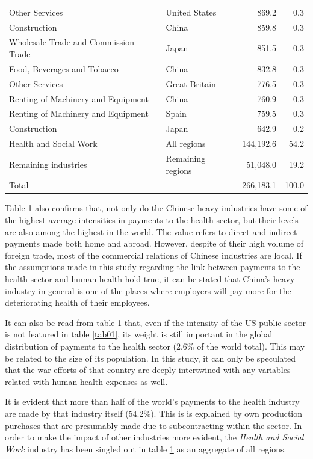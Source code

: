 \documentclass[a4paper,12pt, ]{article}
\begin{document}
\begin{table}
\begin{center}
\begin{tabular}{llrr}
Other Services & United States &  869.2  & 0.3\\ 
Construction & China &  859.8  & 0.3\\ 
Wholesale Trade and Commission Trade & Japan &  851.5  & 0.3\\ 
Food, Beverages and Tobacco & China &  832.8  & 0.3\\ 
Other Services & Great Britain &  776.5  & 0.3\\ 
Renting of Machinery and Equipment & China &  760.9  & 0.3\\ 
Renting of Machinery and Equipment & Spain &  759.5  & 0.3\\ 
Construction & Japan &  642.9  & 0.2\\
\hline
Health and Social Work & All regions & 144,192.6  & 54.2 \\
Remaining industries & Remaining regions &  51,048.0  &  19.2 \\
\hline
Total &  &   266,183.1   &  100.0 \\
\hline
\end{tabular}
\label{tab02} 
\end{center}
\end{table}

Table \ref{tab02} also confirms that, not only do the Chinese heavy industries have some of the highest average intensities in payments to the health sector, but their levels are also among the highest in the world. The value refers to direct and indirect payments made both home and abroad. However, despite of their high volume of foreign trade, most of the commercial relations of Chinese industries are local. If the assumptions made in this study regarding the link between payments to the health sector and human health hold true, it can be stated that China's heavy industry in general is one of the places where employers will pay more for the deteriorating health of their employees.

It can also be read from table \ref{tab02} that, even if the intensity of the US public sector is not featured in table \ref{tab01}, its weight is still important in the global distribution of payments to the health sector (2.6\% of the world total). This may be related to the size of its population. In this study, it can only be speculated that the war efforts of that country are deeply intertwined with any variables related with human health expenses as well. 

It is evident that more than half of the world's payments to the health industry are made by that industry itself (54.2\%). This is is explained by own production purchases that are presumably made due to subcontracting within the sector. In order to make the impact of other industries more evident, the \textit{Health and Social Work} industry has been singled out in table \ref{tab02} as an aggregate of all regions.
\end{document}
